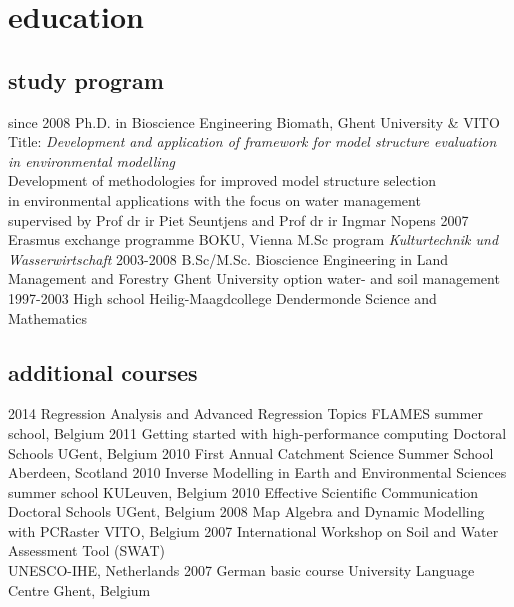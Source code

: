 \documentclass[]{stvhoey-cv}  %
\begin{document}
\section{education}
\subsection*{study program}
\begin{entrylist}
  \entry
    {since 2008}
    {Ph.D. {\normalfont in Bioscience Engineering}}
    {Biomath, Ghent University \& VITO}
    {Title: \emph{Development and application of framework for model structure evaluation in environmental modelling}\\
    Development of methodologies for improved model structure selection\\ in environmental applications with the focus on water management\\ \small{supervised by Prof dr ir Piet Seuntjens and Prof dr ir Ingmar Nopens}}
  \entry
    {2007}
    {Erasmus exchange programme}
    {BOKU, Vienna}
    {M.Sc program \textit{Kulturtechnik und Wasserwirtschaft}}
  \entry
    {2003-2008}
    {B.Sc/M.Sc. Bioscience Engineering in Land Management and Forestry}
    {Ghent University}
    {option water- and soil management}
  \entry
    {1997-2003}
    {High school}
    {Heilig-Maagdcollege Dendermonde}
    {Science and Mathematics}
\end{entrylist}

\subsection*{additional courses}
\begin{entrylist}
  \shortentry
    {2014}
    {Regression Analysis and Advanced Regression Topics}
    {FLAMES summer school, Belgium}
  \shortentry
    {2011}
    {Getting started with high-performance computing}
    {Doctoral Schools UGent, Belgium}
  \shortentry
    {2010}
    {First Annual Catchment Science Summer School}
    {Aberdeen, Scotland}
  \shortentry
    {2010}
    {Inverse Modelling in Earth and Environmental Sciences}
    {summer school KULeuven, Belgium}
  \shortentry
    {2010}
    {Effective Scientific Communication}
    {Doctoral Schools UGent, Belgium}
  \shortentry
    {2008}
    {Map Algebra and Dynamic Modelling with PCRaster}
    {VITO, Belgium}
  \shortentry
    {2007}
    {International Workshop on Soil and Water Assessment Tool (SWAT)\\ }
    {UNESCO-IHE, Netherlands}
  \shortentry
    {2007}
    {German basic course}
    {University Language Centre Ghent, Belgium}
\end{entrylist}
\end{document}
